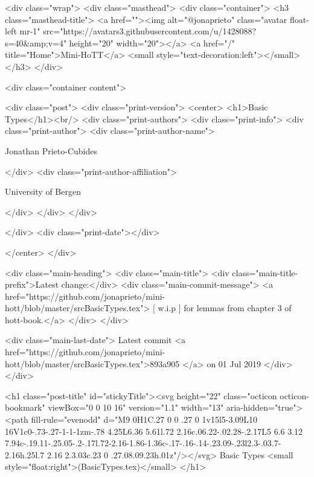     <div class="wrap">
      <div class="masthead">
        <div class="container">
          <h3 class="masthead-title">
            <a href=""><img alt="@jonaprieto" class="avatar float-left mr-1" src="https://avatars3.githubusercontent.com/u/1428088?s=40&amp;v=4" height="20" width="20"></a>
            <a href="/" title="Home">Mini-HoTT</a>
            <small style="text-decoration:left"></small>
          </h3>
        </div>
      
      <div class="container content">
        







<div class="post">
  <div class="print-version">
    <center>
      <h1>Basic Types</h1><br/>
        <div class="print-authors">
          <div class="print-info">
            <div class="print-author">
              <div class="print-author-name">
                
                  Jonathan Prieto-Cubides
                
              </div>
              <div class="print-author-affiliation">
                
                  University of Bergen
                
                </div>
            </div>
          </div>
          
          
        </div>
        <div class="print-date"></div>
        
        
    </center>
  </div>

  
  <div class="main-heading">
    <div class="main-title">
      <div class="main-title-prefix">Latest change:</div>
      <div class="main-commit-message">
            <a href="https://github.com/jonaprieto/mini-hott/blob/master/srcBasicTypes.tex">
              [ w.i.p ] for lemmas from chapter 3 of hott-book.</a>
      </div>
    </div>

    <div class="main-last-date">
      Latest commit <a href="https://github.com/jonaprieto/mini-hott/blob/master/srcBasicTypes.tex">893a905 </a> on  01 Jul 2019
    </div>
  </div>
  

  <h1 class="post-title" id="stickyTitle"><svg height="22" class="octicon octicon-bookmark" viewBox="0 0 10 16" version="1.1" width="13" aria-hidden="true"><path fill-rule="evenodd" d="M9 0H1C.27 0 0 .27 0 1v15l5-3.09L10 16V1c0-.73-.27-1-1-1zm-.78 4.25L6.36 5.61l.72 2.16c.06.22-.02.28-.2.17L5 6.6 3.12 7.94c-.19.11-.25.05-.2-.17l.72-2.16-1.86-1.36c-.17-.16-.14-.23.09-.23l2.3-.03.7-2.16h.25l.7 2.16 2.3.03c.23 0 .27.08.09.23h.01z"/></svg> Basic Types <small style="float:right">(BasicTypes.tex)</small>
  </h1>

